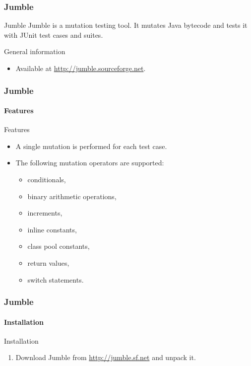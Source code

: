 \begin{frame}[parent={cmap:jumble}, hasprev=false, hasnext=true]
\frametitle{Jumble}

\begin{block:concept}{Jumble}
Jumble is a mutation testing tool. It mutates Java bytecode and tests it
with JUnit test cases and suites.
\end{block:concept}

\begin{block:fact}{General information}
\begin{itemize}
	\item Available at \url{http://jumble.sourceforge.net}.
\end{itemize}
\end{block:fact}
\end{frame}


\begin{frame}[hasprev=true, hasnext=true]
\frametitle{Jumble}
\framesubtitle{Features}

\begin{block:fact}{Features}
\begin{itemize}
	\item A single mutation is performed for each test case.

	\item The following mutation operators are supported:
	\begin{itemize}
		\item conditionals,
		\item binary arithmetic operations,
		\item increments,
		\item inline constants,
		\item class pool constants,
		\item return values,
		\item switch statements.
	\end{itemize}
\end{itemize}
\end{block:fact}
\end{frame}


\begin{frame}
\frametitle{Jumble}
\framesubtitle{Installation}

\begin{block:procedure}{Installation}
\begin{enumerate}
	\item Download Jumble from \url{http://jumble.sf.net} and unpack it.
\end{enumerate}
\end{block:procedure}
\end{frame}



